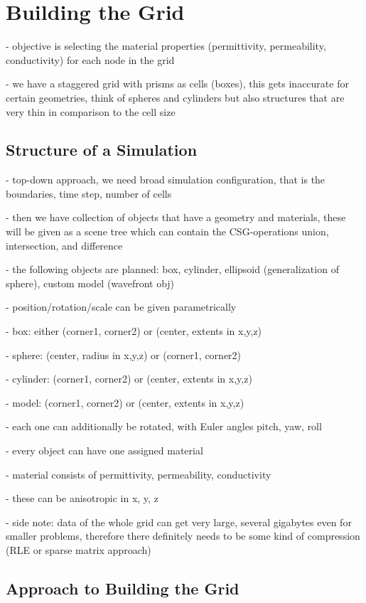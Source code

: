\documentclass[]{report}
\begin{document}
\section{Building the Grid}

- objective is selecting the material properties (permittivity, permeability, conductivity) for each node in the grid

- we have a staggered grid with prisms as cells (boxes), this gets inaccurate for certain geometries, think of spheres and cylinders but also structures that are very thin in comparison to the cell size

\subsection{Structure of a Simulation}

- top-down approach, we need broad simulation configuration, that is the boundaries, time step, number of cells

- then we have collection of objects that have a geometry and materials, these will be given as a scene tree which can contain the CSG-operations union, intersection, and difference

- the following objects are planned: box, cylinder, ellipsoid (generalization of sphere), custom model (wavefront obj)

- position/rotation/scale can be given parametrically

- box: either (corner1, corner2) or (center, extents in x,y,z)

- sphere: (center, radius in x,y,z) or (corner1, corner2)

- cylinder: (corner1, corner2) or (center, extents in x,y,z)

- model: (corner1, corner2) or (center, extents in x,y,z)

- each one can additionally be rotated, with Euler angles pitch, yaw, roll

- every object can have one assigned material

- material consists of permittivity, permeability, conductivity

- these can be anisotropic in x, y, z

- side note: data of the whole grid can get very large, several gigabytes even for smaller problems, therefore there definitely needs to be some kind of compression (RLE or sparse matrix approach)

\subsection{Approach to Building the Grid}
\end{document}
